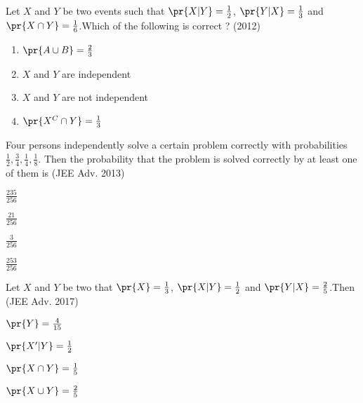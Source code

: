 \iffalse
\title{Assignment}
\author{Y.Harsha Vardhan Reddy}
\section{mcq-multiple}
\fi
    \item Let $X$ and $Y$ be two events such that $\pr{X|Y}=\frac{1}{2}$, $\pr{Y|X}=\frac{1}{3}$ and $\pr{X\cap Y}=\frac{1}{6}$.Which of the following is  correct ?
    \hfill{(2012)}
    \begin{enumerate}
    
        
    
        \item $\pr{A\cup B}=\frac{2}{3}$
        \item $X$ and $Y$ are independent 
        \item $X$ and $Y$ are not independent
        \item $\pr{X^C \cap Y}=\frac{1}{3}$ 
        
        \end{enumerate}
        \item Four persons independently solve a certain problem correctly with probabilities $\frac{1}{2},\frac{3}{4},\frac{1}{4},\frac{1}{8}$. Then the probability that the problem is solved correctly by at least one of them is 
        \hfill{(JEE Adv. 2013)}
        \begin{enumerate}
        \begin{multicols}{4}
            \item $\frac{235}{256}$
            \item $\frac{21}{256}$
            \item $\frac{3}{256}$
            \item $\frac{253}{256}$
            \end{multicols}
        \end{enumerate}
\item Let $X$ and $Y$ be two that $\pr{X}=\frac{1}{3}$, $\pr{X|Y}=\frac{1}{2}$ and $\pr{Y|X}=\frac{2}{5}$.Then 
        \hfill{(JEE Adv. 2017)}
        \begin{enumerate}
        \begin{multicols}{2}
            \item $\pr{Y}=\frac{4}{15}$
            \columnbreak
            \item $\pr{X^\prime|Y}=\frac{1}{2}$
            \end{multicols}
            \begin{multicols}{2}
            \item $\pr{X\cap Y}=\frac{1}{5}$
            \item $\pr{X \cup Y}=\frac{2}{5}$
            \end{multicols}
        \end{enumerate}
